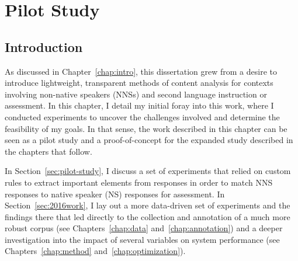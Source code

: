 \chapter{Pilot Study}
\label{chap:pilot}

\section{Introduction}
As discussed in Chapter~\ref{chap:intro}, this dissertation grew from a desire to introduce lightweight, transparent methods of content analysis for contexts involving non-native speakers (NNSs) and second language instruction or assessment. In this chapter, I detail my initial foray into this work, where I conducted experiments to uncover the challenges involved and determine the feasibility of my goals. In that sense, the work described in this chapter can be seen as a pilot study and a proof-of-concept for the expanded study described in the chapters that follow.

In Section~\ref{sec:pilot-study}, I discuss a set of experiments that relied on custom rules to extract important elements from responses in order to match NNS responses to native speaker (NS) responses for assessment. In Section~\ref{sec:2016work}, I lay out a more data-driven set of experiments and the findings there that led directly to the collection and annotation of a much more robust corpus (see Chapters~\ref{chap:data} and~\ref{chap:annotation}) and a deeper investigation into the impact of several variables on system performance (see Chapters~\ref{chap:method} and~\ref{chap:optimization}).

%


